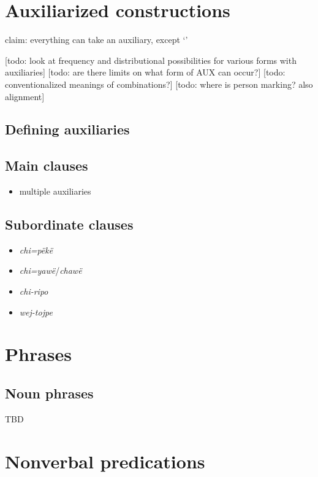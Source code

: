 \documentclass{memoir}
\begin{document}
\chapter{Auxiliarized constructions}

claim: everything can take an auxiliary, except  `'

{[}todo: look at frequency and distributional possibilities for various
forms with auxiliaries{]} {[}todo: are there limits on what form of AUX
can occur?{]} {[}todo: conventionalized meanings of combinations?{]}
{[}todo: where is person marking? also alignment{]}

\section{Defining auxiliaries}

\section{Main clauses}

\begin{itemize}
\tightlist
\item
  multiple auxiliaries
\end{itemize}

\section{Subordinate clauses}

\begin{itemize}
\tightlist
\item
  \emph{chi=pëkë}
\item
  \emph{chi=yawë}/\emph{chawë}
\item
  \emph{chi-ripo}
\item
  \emph{wej-tojpe}
\end{itemize}

\chapter{\texorpdfstring{Phrases \label{phrases}}{Phrases }}

\section{\texorpdfstring{Noun phrases
\label{sec:nounphrases}}{Noun phrases }}

TBD

\chapter{\texorpdfstring{Nonverbal predications
\label{nonverbal}}{Nonverbal predications }}
\end{document}
